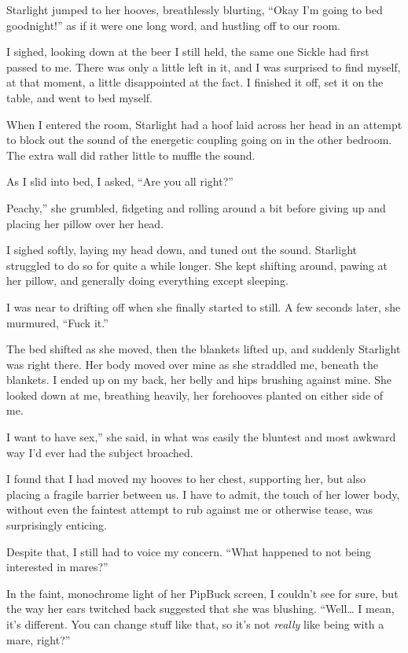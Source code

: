 Starlight jumped to her hooves, breathlessly blurting, “Okay I’m going to bed goodnight!” as if it were one long word, and hustling off to our room.

I sighed, looking down at the beer I still held, the same one Sickle had first passed to me. There was only a little left in it, and I was surprised to find myself, at that moment, a little disappointed at the fact. I finished it off, set it on the table, and went to bed myself.

When I entered the room, Starlight had a hoof laid across her head in an attempt to block out the sound of the energetic coupling going on in the other bedroom. The extra wall did rather little to muffle the sound.

As I slid into bed, I asked, “Are you all right?”

\leavevmode{}Peachy,” she grumbled, fidgeting and rolling around a bit before giving up and placing her pillow over her head.

I sighed softly, laying my head down, and tuned out the sound. Starlight struggled to do so for quite a while longer. She kept shifting around, pawing at her pillow, and generally doing everything except sleeping.

I was near to drifting off when she finally started to still. A few seconds later, she murmured, “Fuck it.”

The bed shifted as she moved, then the blankets lifted up, and suddenly Starlight was right there. Her body moved over mine as she straddled me, beneath the blankets. I ended up on my back, her belly and hips brushing against mine. She looked down at me, breathing heavily, her forehooves planted on either side of me.

\leavevmode{}I want to have sex,” she said, in what was easily the bluntest and most awkward way I’d ever had the subject broached.

I found that I had moved my hooves to her chest, supporting her, but also placing a fragile barrier between us. I have to admit, the touch of her lower body, without even the faintest attempt to rub against me or otherwise tease, was surprisingly enticing.

Despite that, I still had to voice my concern. “What happened to not being interested in mares?”

In the faint, monochrome light of her PipBuck screen, I couldn’t see for sure, but the way her ears twitched back suggested that she was blushing. “Well… I mean, it’s different. You can change stuff like that, so it’s not \textit{really} like being with a mare, right?”

